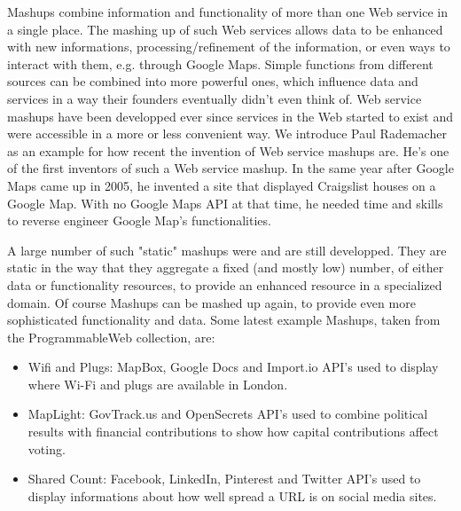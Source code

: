 







Mashups combine information and functionality of more than one Web service in a single place.
The mashing up of such Web services allows data to be enhanced with new informations, processing/refinement of the information, or even ways to interact with them, e.g. through Google Maps.
Simple functions from different sources can be combined into more powerful ones, which influence data and services in a way their founders eventually didn't even think of.
Web service mashups have been developped ever since services in the Web started to exist and were accessible in a more or less convenient way.
We introduce Paul Rademacher as an example for how recent the invention of Web service mashups are.
He's one of the first inventors of such a Web service mashup.
In the same year after Google Maps came up in 2005, he invented a site that displayed Craigslist houses on a Google Map.
With no Google Maps API at that time, he needed time and skills to reverse engineer Google Map's functionalities.


A large number of such "static" mashups were and are still developped.
They are static in the way that they aggregate a fixed (and mostly low) number, of either data or functionality resources, to provide an enhanced resource in a specialized domain.
Of course Mashups can be mashed up again, to provide even more sophisticated functionality and data.
Some latest example Mashups, taken from the ProgrammableWeb collection, are:

\begin{itemize}
  \item Wifi and Plugs: MapBox, Google Docs and Import.io API's used to display where Wi-Fi and plugs are available in London.
  \item MapLight: GovTrack.us and OpenSecrets API's used to combine political results with financial contributions to show how capital contributions affect voting.
  \item Shared Count: Facebook, LinkedIn, Pinterest and Twitter API's used to display informations about how well spread a URL is on social media sites.
\end{itemize}


